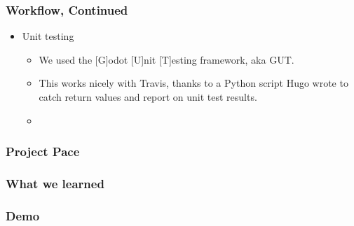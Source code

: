 \documentclass{beamer}
\begin{document}
\begin{frame}
    \frametitle{Workflow, Continued}
    \begin{itemize}
    		\pause \item Unit testing
    		\begin{itemize}
    			\pause \item We used the [G]odot [U]nit [T]esting framework, aka GUT.
    			\pause \item This works nicely with Travis, thanks to a Python script Hugo wrote to catch return values and report on unit test results.
    			\pause \item 
    		\end{itemize}
	\end{itemize}     
\end{frame}

\begin{frame}
    \frametitle{Project Pace} %
\end{frame}

\begin{frame}
  \frametitle{What we learned} %
\end{frame}

\begin{frame}
  \frametitle{Demo} %
\end{frame}
\end{document}
